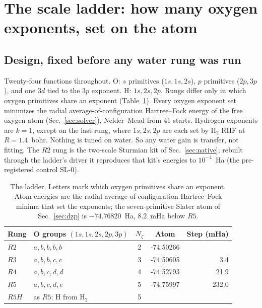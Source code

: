 \documentclass[aps,pra,twocolumn,superscriptaddress,longbibliography]{revtex4-2}
\begin{document}
\section{The scale ladder: how many oxygen exponents, set on the atom}
\label{sec:ladder}

\subsection{Design, fixed before any water rung was run}

Twenty-four functions throughout.  O: $s$ primitives ($1s,1s,2s$), $p$
primitives ($2p,3p$), and one $3d$ tied to the $3p$ exponent.  H:
$1s,2s,2p$.  Rungs differ only in which oxygen primitives share an
exponent (Table~\ref{tab:ladder_design}).  Every oxygen exponent set
minimizes the radial average-of-configuration Hartree--Fock energy of
the free oxygen atom (Sec.~\ref{sec:solver}), Nelder--Mead from 41
starts.  Hydrogen exponents are $k=1$, except on the last rung, where
$1s,2s,2p$ are each set by H$_2$ RHF at $R=1.4$~bohr.  Nothing is tuned
on water.  So any water gain is transfer, not fitting.  The $R2$ rung
is the two-scale Sturmian kit of Sec.~\ref{sec:native}; rebuilt through
the ladder's driver it reproduces that kit's energies to $10^{-4}$~Ha
(the pre-registered control SL-0).

\begin{table}[t]
\caption{The ladder.  Letters mark which oxygen primitives share an
exponent.  Atom energies are the radial average-of-configuration
Hartree--Fock minima that set the exponents; the seven-primitive Slater
atom of Sec.~\ref{sec:dzp} is $-74.76820$~Ha, $8.2$~mHa below $R5$.}
\label{tab:ladder_design}
\begin{ruledtabular}
\begin{tabular}{llcrr}
Rung & O groups $(1s,1s,2s,2p,3p)$ & $N_\zeta$ & \multicolumn{1}{c}{Atom}
& \multicolumn{1}{c}{Step (mHa)} \\
\hline
$R2$ & $a,b,b,b,b$ & 2 & -74.50266 & \\
$R3$ & $a,b,b,c,c$ & 3 & -74.50605 & 3.4 \\
$R4$ & $a,b,c,d,d$ & 4 & -74.52793 & 21.9 \\
$R5$ & $a,b,c,d,e$ & 5 & -74.75997 & 232.0 \\
$R5H$ & as $R5$; H from H$_2$ & 5 & & \\
\end{tabular}
\end{ruledtabular}
\end{table}
\end{document}
